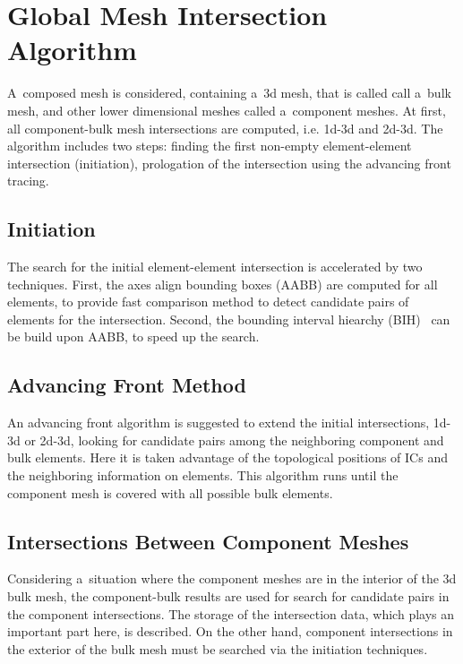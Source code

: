 \section{Global Mesh Intersection Algorithm}
\label{sec:front_advancing}
A~composed mesh is considered, containing a~3d mesh, that is called call a~bulk mesh, and
other lower dimensional meshes called a~component meshes. 
At first, all component-bulk mesh intersections are computed, i.e. 1d-3d and 2d-3d.
The algorithm includes two steps: finding the first non-empty element-element intersection (initiation),
prologation of the intersection using the advancing front tracing.

\subsection{Initiation}
\label{sec:initiation}
The search for the initial element-element intersection is accelerated by two techniques.
First, the axes align bounding boxes (AABB) are computed for all elements, to provide fast
comparison method to detect candidate pairs of elements for the intersection.
Second, the bounding interval hiearchy (BIH)~\cite{wachter_instant_2006} can be build upon AABB, to speed up the search.

\subsection{Advancing Front Method}
\label{sec:front}
An advancing front algorithm is suggested to extend the initial intersections, 1d-3d or 2d-3d,
looking for candidate pairs among the neighboring component and bulk elements.
Here it is taken advantage of the topological positions of ICs and the neighboring information on elements.
This algorithm runs until the component mesh is covered with all possible bulk elements.

\subsection{Intersections Between Component Meshes}
\label{sec:components}
Considering a~situation where the component meshes are in the interior of the 3d bulk mesh,
the component-bulk results are used for search for candidate pairs in the component intersections.
The storage of the intersection data, which plays an important part here, is described.
On the other hand, component intersections in the exterior of the bulk mesh must be searched via the initiation
techniques.


